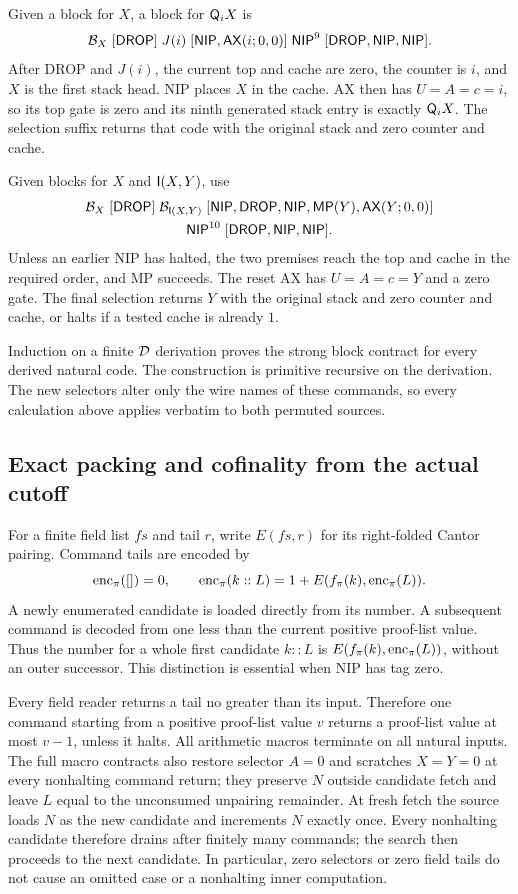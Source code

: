 Given a block for $X$, a block for $\mathsf Q_iX$ is
\[
 \mathcal B_X\;[\mathsf{DROP}]\;J(i)\;[\mathsf{NIP},\mathsf{AX}(i;0,0)]\;
 \mathsf{NIP}^9\;[\mathsf{DROP},\mathsf{NIP},\mathsf{NIP}].
\]
After DROP and $J(i)$, the current top and cache are zero, the counter
is $i$, and $X$ is the first stack head. NIP places $X$ in the cache.
AX then has $U=A=c=i$, so its top gate is zero and its ninth generated
stack entry is exactly $\mathsf Q_iX$. The selection suffix returns that code
with the original stack and zero counter and cache.

Given blocks for $X$ and $\mathsf I(X,Y)$, use
\begin{multline*}
 \mathcal B_X\;[\mathsf{DROP}]\;\mathcal B_{\mathsf I(X,Y)}\;
 [\mathsf{NIP},\mathsf{DROP},\mathsf{NIP},\mathsf{MP}(Y),\mathsf{AX}(Y;0,0)]\\
 {}\mathsf{NIP}^{10}\;[\mathsf{DROP},\mathsf{NIP},\mathsf{NIP}].
\end{multline*}
Unless an earlier NIP has halted, the two premises reach the top and
cache in the required order, and MP succeeds. The reset AX has
$U=A=c=Y$ and a zero gate. The final selection returns $Y$ with the
original stack and zero counter and cache, or halts if a tested cache
is already $1$.

Induction on a finite $\mathcal D$ derivation proves the strong block contract
for every derived natural code. The construction is primitive recursive
on the derivation. The new selectors alter only the wire names of these
commands, so every calculation above applies verbatim to both permuted
sources.

\subsection{Exact packing and cofinality from the actual cutoff}

For a finite field list $fs$ and tail $r$, write $E(fs,r)$ for its
right-folded Cantor pairing. Command tails are encoded by
\[
 \operatorname{enc}_\pi([])=0,\qquad
 \operatorname{enc}_\pi(k::L)=1+E(f_\pi(k),\operatorname{enc}_\pi(L)).
\]
A newly enumerated candidate is loaded directly from its number. A
subsequent command is decoded from one less than the current positive
proof-list value. Thus the number for a whole first candidate
$k::L$ is $E(f_\pi(k),\operatorname{enc}_\pi(L))$, without an outer successor.
This distinction is essential when NIP has tag zero.

Every field reader returns a tail no greater than its input. Therefore
one command starting from a positive proof-list value $v$ returns a
proof-list value at most $v-1$, unless it halts. All arithmetic macros
terminate on all natural inputs. The full macro contracts also restore
selector $A=0$ and scratches $X=Y=0$ at every nonhalting command return;
they preserve $N$ outside candidate fetch and leave $L$ equal to the
unconsumed unpairing remainder. At fresh fetch the source loads $N$
as the new candidate and increments $N$ exactly once. Every nonhalting
candidate therefore drains after finitely many commands; the search
then proceeds to the next candidate. In particular, zero selectors or
zero field tails do not cause an omitted case or a nonhalting inner
computation.


